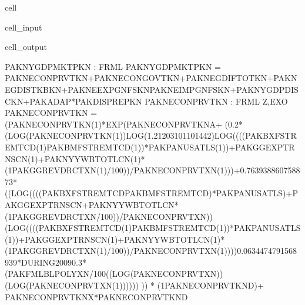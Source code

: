 \documentclass[letterpaper,10pt,english]{jupyterBook}
\begin{document}
\begin{sphinxuseclass}{cell}\begin{sphinxVerbatimInput}

\begin{sphinxuseclass}{cell_input}
\begin{sphinxVerbatim}[commandchars=\\\{\}]
\PYG{p}{[}\PYG{p}{]}
\end{sphinxVerbatim}

\end{sphinxuseclass}\end{sphinxVerbatimInput}
\begin{sphinxVerbatimOutput}

\begin{sphinxuseclass}{cell_output}
\begin{sphinxVerbatim}[commandchars=\\\{\}]
PAKNYGDPMKTPKN : FRML \PYGZlt{}\PYGZgt{} PAKNYGDPMKTPKN = PAKNECONPRVTKN+PAKNECONGOVTKN+PAKNEGDIFTOTKN+PAKNEGDISTKBKN+PAKNEEXPGNFSKN\PYGZhy{}PAKNEIMPGNFSKN+PAKNYGDPDISCKN+PAKADAP*PAKDISPREPKN \PYGZdl{}
PAKNECONPRVTKN : FRML \PYGZlt{}Z,EXO\PYGZgt{} PAKNECONPRVTKN = (PAKNECONPRVTKN(\PYGZhy{}1)*EXP(PAKNECONPRVTKN\PYGZus{}A+ (\PYGZhy{}0.2*(LOG(PAKNECONPRVTKN(\PYGZhy{}1))\PYGZhy{}LOG(1.21203101101442)\PYGZhy{}LOG((((PAKBXFSTREMTCD(\PYGZhy{}1)\PYGZhy{}PAKBMFSTREMTCD(\PYGZhy{}1))*PAKPANUSATLS(\PYGZhy{}1))+PAKGGEXPTRNSCN(\PYGZhy{}1)+PAKNYYWBTOTLCN(\PYGZhy{}1)*(1\PYGZhy{}PAKGGREVDRCTXN(\PYGZhy{}1)/100))/PAKNECONPRVTXN(\PYGZhy{}1)))+0.763938860758873*((LOG((((PAKBXFSTREMTCD\PYGZhy{}PAKBMFSTREMTCD)*PAKPANUSATLS)+PAKGGEXPTRNSCN+PAKNYYWBTOTLCN*(1\PYGZhy{}PAKGGREVDRCTXN/100))/PAKNECONPRVTXN))\PYGZhy{}(LOG((((PAKBXFSTREMTCD(\PYGZhy{}1)\PYGZhy{}PAKBMFSTREMTCD(\PYGZhy{}1))*PAKPANUSATLS(\PYGZhy{}1))+PAKGGEXPTRNSCN(\PYGZhy{}1)+PAKNYYWBTOTLCN(\PYGZhy{}1)*(1\PYGZhy{}PAKGGREVDRCTXN(\PYGZhy{}1)/100))/PAKNECONPRVTXN(\PYGZhy{}1))))\PYGZhy{}0.0634474791568939*DURING\PYGZus{}2009\PYGZhy{}0.3*(PAKFMLBLPOLYXN/100\PYGZhy{}((LOG(PAKNECONPRVTXN))\PYGZhy{}(LOG(PAKNECONPRVTXN(\PYGZhy{}1)))))) )) * (1\PYGZhy{}PAKNECONPRVTKN\PYGZus{}D)+ PAKNECONPRVTKN\PYGZus{}X*PAKNECONPRVTKN\PYGZus{}D \PYGZdl{}
\end{sphinxVerbatim}

\end{sphinxuseclass}\end{sphinxVerbatimOutput}

\end{sphinxuseclass}
\end{document}

